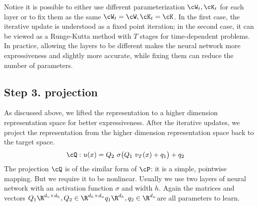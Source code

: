 Notice it is possible to either use different parameterization $\cW_{t}, \cK_{t}$ for each layer or to fix them as the same $\cW_{t} = \cW , \cK_{t} = \cK$. In the first case, the iterative update is understood as a fixed point iteration; in the second case, it can be viewed as a Runge-Kutta method with $T$ stages for time-dependent problems. In practice, allowing the layers to be different makes the neural network more expressiveness and slightly more accurate, while fixing them can reduce the number of parameters.

\subsection{Step 3. projection}
\label{ssec:step3}
As discussed above, we lifted the representation to a higher dimension representation space for better expressiveness. After the iterative updates, we project the representation from the higher dimension representation space back to the target space.
\begin{align*}
\cQ:&\ u(x)= Q_2\ \sigma \big( Q_1\ v_T(x)+q_1 \big) + q_2
\end{align*}
The projection $\cQ$ is of the similar form of $\cP$: it is a simple, pointwise mapping. But we require it to be nonlinear. Usually we use two layers of neural network with an activation function $\sigma$ and width $h$. 
Again the matrices and vectors $Q_1 \R^{d_v \times d_h},  Q_2 \in \R^{d_h \times d_u}
q_1 \R^{d_h}, q_2 \in \R^{d_u}$are all parameters to learn.
\fi







